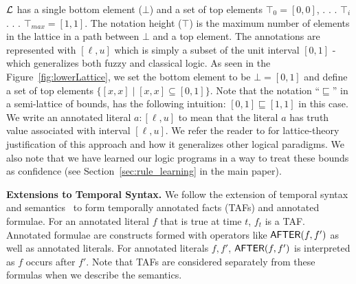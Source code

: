  $\mathcal{L}$ has a single bottom element ($\bot$) and a set of top elements $\top_{0} = [0,0]$, . . . $\top_{i}$ . . . $\top_{max} = [1,1]$. The notation height ($\top$) is the maximum number of elements in the lattice in a path between $\bot$ and a top element. The annotations are represented with $[\ell,u]$ which is simply a subset of the unit interval $[0,1]$ - which generalizes both fuzzy and classical logic. 
As seen in the Figure~\ref{fig:lowerLattice}, we set the bottom element to be $\bot = [0,1]$ and define a set of top elements $\{[x,x] \; | \; [x,x]\subseteq [0,1]\}$.  Note that the notation ``$\sqsubseteq$'' in a semi-lattice of bounds,  has the following intuition: $[0,1] \sqsubseteq [1,1]$ in this case.
We write an annotated literal $a:[\ell,u]$ to mean that the literal $a$ has truth value associated with interval $[\ell,u]$. We refer the reader to \cite{ks92,ssTAI22} for lattice-theory justification of this approach and how it generalizes other logical paradigms. 
We also note that we have learned our logic programs in a way to treat these bounds as confidence (see Section~\ref{sec:rule_learning} in the main paper). 


\noindent\textbf{Extensions to Temporal Syntax.}  We follow the extension of temporal syntax and semantics~\cite{aditya2023pyreason,bavikadi2024geospatial,shakAamas13} to form temporally annotated facts (TAFs) and annotated formulae. For an annotated literal $f$ that is true at time $t$, $f_t$ is a TAF. Annotated formulae are constructs formed with operators like $\textsf{AFTER}(f,f')$ as well as annotated literals. For annotated literals $f,f'$, $\textsf{AFTER}(f,f')$ is interpreted as $f$ occurs after $f'$. Note that TAFs are considered separately from these formulas when we describe the semantics.



